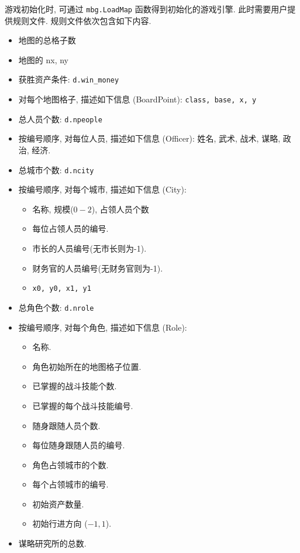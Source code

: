 \documentclass[UTF8, zihao=-4]{ctexart} %
\newcommand{\lcode}{\lstinline} % 段内插入代码
\begin{document}
游戏初始化时, 可通过 \lcode{mbg.LoadMap} 函数得到初始化的游戏引擎. 此时需要用户提供规则文件.
规则文件依次包含如下内容.
\begin{itemize}
    \item 地图的总格子数
    \item 地图的 nx, ny
    \item 获胜资产条件: \lcode{d.win_money}
    \item 对每个地图格子, 描述如下信息 (BoardPoint): \lcode{class, base, x, y} 
    \item 总人员个数: \lcode{d.npeople}
    \item 按编号顺序, 对每位人员, 描述如下信息 (Officer): 姓名, 武术, 战术, 谋略, 政治, 经济.
    \item 总城市个数: \lcode{d.ncity}
    \item 按编号顺序, 对每个城市, 描述如下信息 (City): 
        \begin{itemize}
            \item 名称, 规模($0-2$), 占领人员个数
            \item 每位占领人员的编号.
            \item 市长的人员编号(无市长则为-1).
            \item 财务官的人员编号(无财务官则为-1).
            \item \lcode{x0, y0, x1, y1} 
        \end{itemize}
    \item 总角色个数: \lcode{d.nrole}
    \item 按编号顺序, 对每个角色, 描述如下信息 (Role):
        \begin{itemize}
            \item 名称.
            \item 角色初始所在的地图格子位置.
            \item 已掌握的战斗技能个数.
            \item 已掌握的每个战斗技能编号.
            \item 随身跟随人员个数.
            \item 每位随身跟随人员的编号.
            \item 角色占领城市的个数.
            \item 每个占领城市的编号.
            \item 初始资产数量.
            \item 初始行进方向 ($-1, 1$).
        \end{itemize}
    \item 谋略研究所的总数.

\end{itemize}
\end{document}
